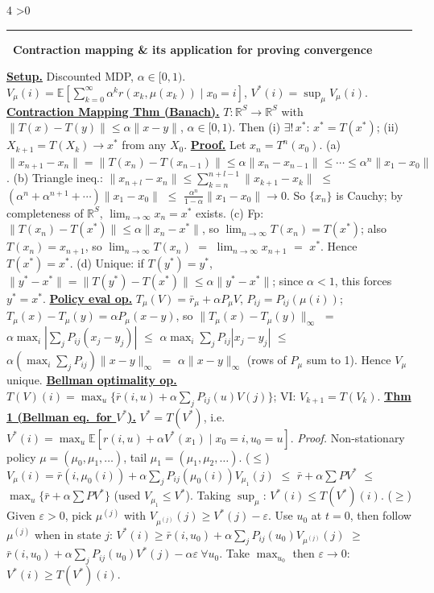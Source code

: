 \documentclass[10pt,landscape,letterpaper]{article}
\let\oldtextbf\textbf
\renewcommand{\textbf}[1]{\uline{\oldtextbf{#1}}}
\renewcommand{\section}[1]{%
  \ifnum\value{section}>0\par\vspace{1pt}\hrule\vspace{1pt}\fi
  \refstepcounter{section}\oldtextbf{\thesection\ #1}\ }
\begin{document}
\begin{multicols*}{4}
\section{Contraction mapping \& its application for proving convergence}

\textbf{Setup.} Discounted MDP, \(\alpha\in[0,1)\).
\(V_\mu(i)=\mathbb{E}[\sum_{k=0}^\infty\alpha^k r(x_k,\mu(x_k))\mid x_0=i]\),
\(V^*(i)=\sup_\mu V_\mu(i)\).
\textbf{Contraction Mapping Thm (Banach).} \(T\!:\!\mathbb{R}^S\!\to\!\mathbb{R}^S\) with
\(\|T(x)-T(y)\|\le\alpha\|x-y\|\), \(\alpha\in[0,1)\). Then
(i) \(\exists!\,x^*\!:\,x^*=T(x^*)\);
(ii) \(X_{k+1}=T(X_k)\to x^*\) from any \(X_0\).
\textbf{Proof.} Let \(x_n{=}T^n(x_0)\).
(a) \(\|x_{n+1}{-}x_n\|=\|T(x_n){-}T(x_{n-1})\|\le\alpha\|x_n{-}x_{n-1}\|\le\cdots\le\alpha^n\|x_1{-}x_0\|\).
(b) Triangle ineq.: \(\|x_{n+l}{-}x_n\|\le\sum_{k=n}^{n+l-1}\!\|x_{k+1}{-}x_k\|\) \(\le\) \((\alpha^n{+}\alpha^{n+1}{+}\cdots)\|x_1{-}x_0\|\) \(\le\) \(\tfrac{\alpha^n}{1-\alpha}\|x_1{-}x_0\|\to 0\).
So \(\{x_n\}\) is Cauchy; by completeness of \(\mathbb R^S\), \(\lim_{n\to\infty}x_n=x^*\) exists.
(c) Fp: \(\|T(x_n){-}T(x^*)\|\le\alpha\|x_n{-}x^*\|\), so \(\lim_{n\to\infty}T(x_n)=T(x^*)\); also \(T(x_n){=}x_{n+1}\), so \(\lim_{n\to\infty}T(x_n)\) \(=\) \(\lim_{n\to\infty}x_{n+1}\) \(=\) \(x^*\). Hence \(T(x^*){=}x^*\).
(d) Unique: if \(T(y^*){=}y^*\), \(\|y^*{-}x^*\|=\|T(y^*){-}T(x^*)\|\le\alpha\|y^*{-}x^*\|\); since \(\alpha{<}1\), this forces \(y^*{=}x^*\).
\textbf{Policy eval op.} \(T_\mu(V){=}\bar r_\mu+\alpha P_\mu V\), \(P_{ij}{=}P_{ij}(\mu(i))\); \(T_\mu(x){-}T_\mu(y)=\alpha P_\mu(x{-}y)\), so
\(\|T_\mu(x){-}T_\mu(y)\|_\infty\) \(=\) \(\alpha\max_i|\!\sum_j\!P_{ij}(x_j{-}y_j)|\) \(\le\) \(\alpha\max_i\!\sum_j\!P_{ij}|x_j{-}y_j|\) \(\le\) \(\alpha(\max_i\!\sum_j\!P_{ij})\|x{-}y\|_\infty\) \(=\) \(\alpha\|x{-}y\|_\infty\) (rows of \(P_\mu\) sum to 1). Hence \(V_\mu\) unique.
\textbf{Bellman optimality op.}
\(T(V)(i)=\max_u\{\bar r(i,u)+\alpha\!\sum_j\!P_{ij}(u)V(j)\}\); VI: \(V_{k+1}=T(V_k)\).
\textbf{Thm 1 (Bellman eq.\ for \(V^*\)).} \(V^*=T(V^*)\), i.e.\
\(V^*(i)=\max_u\mathbb E[r(i,u)+\alpha V^*(x_1)\!\mid\!x_0{=}i,u_0{=}u]\).
\emph{Proof.} Non-stationary policy \(\mu{=}(\mu_0,\mu_1,\ldots)\), tail \(\mu_1{=}(\mu_1,\mu_2,\ldots)\).
(\(\le\)) \(V_\mu(i)=\bar r(i,\mu_0(i))+\alpha\!\sum_j\!P_{ij}(\mu_0(i))V_{\mu_1}(j)\) \(\le\) \(\bar r+\alpha\!\sum\!PV^*\) \(\le\) \(\max_u\{\bar r+\alpha\!\sum\!PV^*\}\) (used \(V_{\mu_1}\!\le\!V^*\)). Taking \(\sup_\mu\): \(V^*(i)\le T(V^*)(i)\).
(\(\ge\)) Given \(\varepsilon{>}0\), pick \(\mu^{(j)}\) with \(V_{\mu^{(j)}}(j)\ge V^*(j){-}\varepsilon\). Use \(u_0\) at \(t{=}0\), then follow \(\mu^{(j)}\) when in state \(j\): \(V^*(i)\ge\bar r(i,u_0)+\alpha\!\sum_j\!P_{ij}(u_0)V_{\mu^{(j)}}(j)\) \(\ge\) \(\bar r(i,u_0)+\alpha\!\sum_j\!P_{ij}(u_0)V^*(j)-\alpha\varepsilon\ \forall u_0\). Take \(\max_{u_0}\) then \(\varepsilon{\to}0\): \(V^*(i)\ge T(V^*)(i)\).

\end{multicols*}
\end{document}
